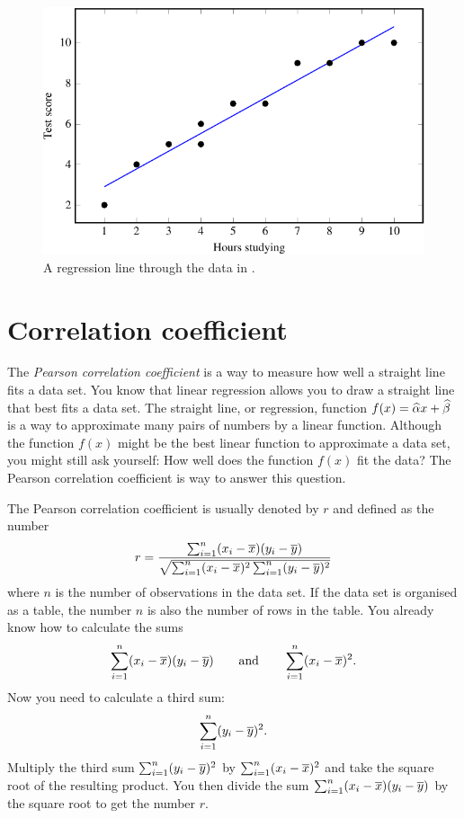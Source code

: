 \documentclass[a4paper,oneside,12pt]{article}
\begin{document}
{\begin{solution}
\begin{figure}[!htbp]
\centering
\includegraphics[scale=1.1]{image/07/test-score-regression.pdf}
\caption{%
  A regression line through the data in .
}
\label{fig:test_score_regression}
\end{figure}
\end{solution}
}{}



\section{Correlation coefficient}

The \emph{Pearson correlation coefficient} is a way to measure how
well a straight line fits a data set.  You know that linear regression
allows you to draw a straight line that best fits a data set.  The
straight line, or regression, function $f(x) = \widehat{\alpha} x + \widehat{\beta}$
is a way to approximate many pairs of numbers by a linear function.
Although the function $f(x)$ might be the best linear function to
approximate a data set, you might still ask yourself: How well does
the function $f(x)$ fit the data?  The Pearson correlation coefficient
is way to answer this question.

The Pearson correlation coefficient is usually denoted by $r$ and
defined as the number
\begin{equation}
\label{eqn:Pearson_correlation_coefficient}
r
=
\frac{
  \sum_{i=1}^n (x_i - \overline{x}) (y_i - \overline{y})
}{
  \sqrt{
    \sum_{i=1}^n (x_i - \overline{x})^2 \sum_{i=1}^n (y_i - \overline{y})^2
  }
}
\end{equation}
where $n$ is the number of observations in the data set.  If the data
set is organised as a table, the number $n$ is also the number of rows
in the table.  You already know how to calculate the sums
\[
\sum_{i=1}^n (x_i - \overline{x}) (y_i - \overline{y})
\qquad
\text{and}
\qquad
\sum_{i=1}^n (x_i - \overline{x})^2.
\]
Now you need to calculate a third sum:
\[
\sum_{i=1}^n (y_i - \overline{y})^2.
\]
Multiply the third sum $\sum_{i=1}^n (y_i - \overline{y})^2$ by
$\sum_{i=1}^n (x_i - \overline{x})^2$ and take the square root of the
resulting product.  You then divide the sum
$\sum_{i=1}^n (x_i - \overline{x}) (y_i - \overline{y})$ by the square root to get
the number $r$.
\end{document}
